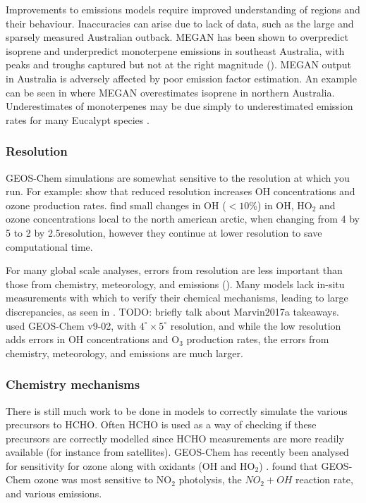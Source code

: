      Improvements to emissions models require improved understanding of regions and their behaviour.
      Inaccuracies can arise due to lack of data, such as the large and sparsely measured Australian outback.
      MEGAN has been shown to overpredict isoprene and underpredict monoterpene emissions in southeast Australia, with peaks and troughs captured but not at the right magnitude (\cite{Emmerson2016}).
      MEGAN output in Australia is adversely affected by poor emission factor estimation. 
      An example can be seen in \citet{Muller2008} where MEGAN overestimates isoprene in northern Australia.
      Underestimates of monoterpenes may be due simply to underestimated emission rates for many Eucalypt species \citep{Winters2009}.
    
    \subsubsection{Resolution}
      \label{LR:Models:Uncert:Resolution}
      GEOS-Chem simulations are somewhat sensitive to the resolution at which you run.
      For example: \cite{Wild2006} show that reduced resolution increases OH concentrations and ozone production rates.
      \cite{Christian2017} find small changes in OH ($<10$\%) in OH, HO$_2$ and ozone concentrations local to the north american arctic, when changing from 4 by 5 to 2 by 2.5\degr resolution, however they continue at lower resolution to save computational time.
    
      For many global scale analyses, errors from resolution are less important than those from chemistry, meteorology, and emissions (\cite{Christian2017}).
      Many models lack in-situ measurements with which to verify their chemical mechanisms, leading to large discrepancies, as seen in \cite{Marvin2017a}.
      TODO: briefly talk about Marvin2017a takeaways.
      \cite{Christian2017} used GEOS-Chem v9-02, with $4^{\circ} \times 5^{\circ}$ resolution, and while the low resolution adds errors in OH concentrations and O$_3$ production rates, the errors from chemistry, meteorology, and emissions are much larger.
            
    
    \subsubsection{Chemistry mechanisms}
      \label{LR:Models:Uncert:Chemistry}
      There is still much work to be done in models to correctly simulate the various precursors to HCHO.
      Often HCHO is used as a way of checking if these precursors are correctly modelled since HCHO measurements are more readily available (for instance from satellites).
      GEOS-Chem has recently been analysed for sensitivity for ozone along with oxidants (OH and HO$_2$) \citep{Christian2017}.
      \cite{Christian2017} found that GEOS-Chem ozone was most sensitive to NO$_2$ photolysis, the $NO_2 + OH$ reaction rate, and various emissions.

